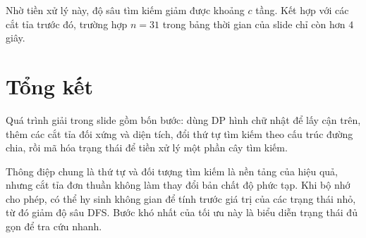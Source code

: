 \documentclass[11pt]{article}
\begin{document}
Nhờ tiền xử lý này, độ sâu tìm kiếm giảm được khoảng \(c\) tầng. Kết hợp với
các cắt tỉa trước đó, trường hợp \(n=31\) trong bảng thời gian của slide chỉ
còn hơn \(4\) giây.

\section{Tổng kết}

Quá trình giải trong slide gồm bốn bước: dùng DP hình chữ nhật để lấy cận
trên, thêm các cắt tỉa đối xứng và diện tích, đổi thứ tự tìm kiếm theo cấu
trúc đường chia, rồi mã hóa trạng thái để tiền xử lý một phần cây tìm kiếm.

Thông điệp chung là thứ tự và đối tượng tìm kiếm là nền tảng của hiệu quả,
nhưng cắt tỉa đơn thuần không làm thay đổi bản chất độ phức tạp. Khi bộ nhớ
cho phép, có thể hy sinh không gian để tính trước giá trị của các trạng thái
nhỏ, từ đó giảm độ sâu DFS. Bước khó nhất của tối ưu này là biểu diễn trạng
thái đủ gọn để tra cứu nhanh.
\end{document}
